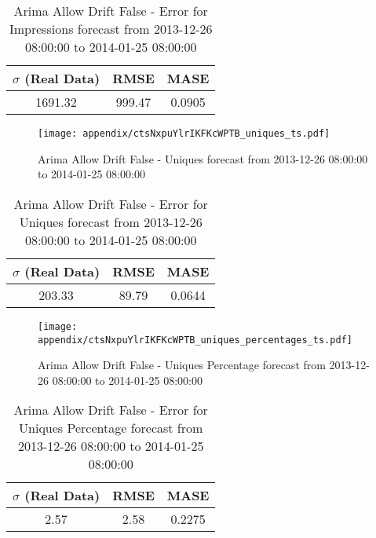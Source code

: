 \begin{table}[H]
\centering
\footnotesize
\begin{tabular}{ccc}
$\sigma$ (Real Data) & RMSE & MASE   \\ \hline
1691.32 & 999.47 & 0.0905 \\
\end{tabular}

\vspace{0.5cm}

\caption{
Arima Allow Drift False - Error for Impressions forecast from 2013-12-26 08:00:00 to 2014-01-25 08:00:00}
\end{table}

\begin{figure}[H] \begin{center} \leavevmode
\texttt{[image: appendix/ctsNxpuYlrIKFKcWPTB\_uniques\_ts.pdf]} \caption{
Arima Allow Drift False - Uniques forecast from 2013-12-26 08:00:00 to 2014-01-25 08:00:00} \label{fig:appendix/ctsNxpuYlrIKFKcWPTB_uniques_ts.pdf} \end{center}
\end{figure}

\begin{table}[H]
\centering
\footnotesize
\begin{tabular}{ccc}
$\sigma$ (Real Data) & RMSE & MASE   \\ \hline
203.33 & 89.79 & 0.0644 \\
\end{tabular}

\vspace{0.5cm}

\caption{
Arima Allow Drift False - Error for Uniques forecast from 2013-12-26 08:00:00 to 2014-01-25 08:00:00}
\end{table}

\begin{figure}[H] \begin{center} \leavevmode
\texttt{[image: appendix/ctsNxpuYlrIKFKcWPTB\_uniques\_percentages\_ts.pdf]} \caption{
Arima Allow Drift False - Uniques Percentage forecast from 2013-12-26 08:00:00 to 2014-01-25 08:00:00} \label{fig:appendix/ctsNxpuYlrIKFKcWPTB_uniques_percentages_ts.pdf} \end{center}
\end{figure}

\begin{table}[H]
\centering
\footnotesize
\begin{tabular}{ccc}
$\sigma$ (Real Data) & RMSE & MASE   \\ \hline
2.57 & 2.58 & 0.2275 \\
\end{tabular}

\vspace{0.5cm}

\caption{
Arima Allow Drift False - Error for Uniques Percentage forecast from 2013-12-26 08:00:00 to 2014-01-25 08:00:00}
\end{table}

